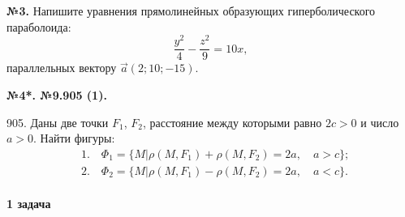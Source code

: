 \documentclass[a4paper,14pt]{extreport} %
\begin{document}
\noindent
\textbf{№3.} Напишите уравнения прямолинейных образующих гиперболического параболоида:
\[
\frac{y^2}{4} - \frac{z^2}{9} = 10x,
\]
параллельных вектору $\vec{a}(2; 10; -15)$.

\noindent
\textbf{№4*. №9.905 (1).}

905. Даны две точки $F_1$, $F_2$, расстояние между которыми равно $2c > 0$ и число $a > 0$. Найти фигуры:
\[
\begin{aligned}
    &1. \quad \Phi_1 = \{M | \rho(M, F_1) + \rho(M, F_2) = 2a, \quad a > c\}; \\
    &2. \quad \Phi_2 = \{M | \rho(M, F_1) - \rho(M, F_2) = 2a, \quad a < c\}.
\end{aligned}
\]










\paragraph {1 задача}
\end{document}
